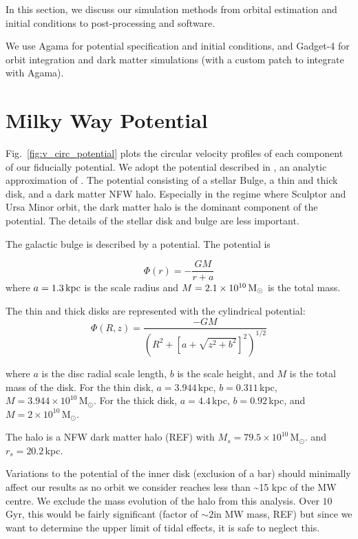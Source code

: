In this section, we discuss our simulation methods from orbital
estimation and initial conditions to post-processing and software.

We use Agama \citep{agama} for potential specification and initial
conditions, and Gadget-4 \citep{gadget4} for orbit integration and dark
matter simulations (with a custom patch to integrate with Agama).

\section{Milky Way Potential}\label{milky-way-potential}

Fig.~\ref{fig:v_circ_potential} plots the circular velocity profiles of
each component of our fiducially potential. We adopt the potential
described in \citet{EP2020}, an analytic approximation of
\citet{mcmillan2011}. The potential consisting of a stellar Bulge, a
thin and thick disk, and a dark matter NFW halo. Especially in the
regime where Sculptor and Ursa Minor orbit, the dark matter halo is the
dominant component of the potential. The details of the stellar disk and
bulge are less important.

The galactic bulge is described by a \citet{hernquist1990} potential.
The potential is

\begin{equation}{
\Phi(r) = - \frac{GM}{r + a}
}\end{equation} where \(a=1.3\,{\rm kpc}\) is the scale radius and
\(M=2.1 \times 10^{10}\,{\rm M}_{\odot}\) is the total mass.

The thin and thick disks are represented with the
\citet{miyamoto+nagai1975} cylindrical potential: \begin{equation}{
\Phi(R, z) = \frac{-GM}{\left(R^2 + \left[a + \sqrt{z^2 + b^2}\right]^{2}\right)^{1/2}}
}\end{equation}

where \(a\) is the disc radial scale length, \(b\) is the scale height,
and \(M\) is the total mass of the disk. For the thin disk,
\(a=3.944\,\)kpc, \(b=0.311\,\)kpc,
\(M=3.944\times10^{10}\,\)M\(_\odot\). For the thick disk,
\(a=4.4\,\)kpc, \(b=0.92\,\)kpc, and \(M=2\times10^{10}\,\)M\(_\odot\).

The halo is a NFW dark matter halo (REF) with
\(M_s=79.5\times10^{10}\,\)M\(_\odot\). and \(r_s = 20.2\,\)kpc.

Variations to the potential of the inner disk (exclusion of a bar)
should minimally affect our results as no orbit we consider reaches less
than \textasciitilde15 kpc of the MW centre. We exclude the mass
evolution of the halo from this analysis. Over \(10\,\)Gyr, this would
be fairly significant (factor of \(\sim 2\)in MW mass, REF) but since we
want to determine the upper limit of tidal effects, it is safe to
neglect this.

